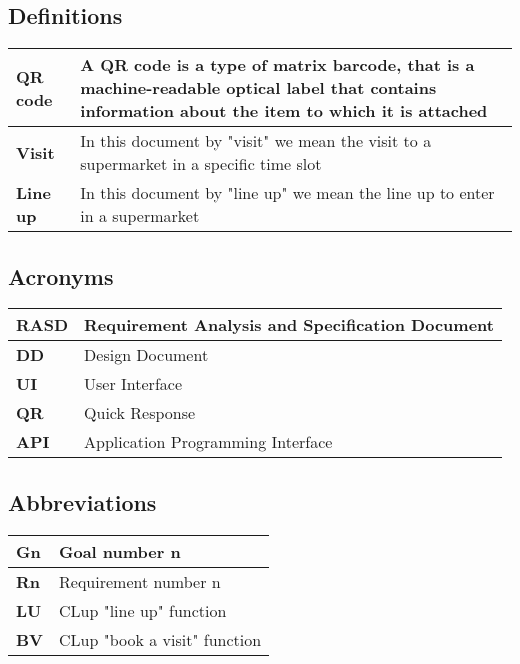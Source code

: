 \subsection{Definitions}

    \begin{center}
        {\renewcommand{\arraystretch}{2}%
        \begin{tabular}{L{2cm}L{12cm}}
            \hline
            \textbf{QR code} & A QR code is a type of matrix barcode, that is a machine-readable optical label that 
            contains information about the item to which it is attached \\
            \hline
            \textbf{Visit} & In this document by "visit" we mean the visit to a supermarket in a specific time slot \\
            \hline
            \textbf{Line up} & In this document by "line up" we mean the line up to enter in a supermarket \\
            \hline
        \end{tabular}}
    \end{center}
    

\subsection{Acronyms}

    \begin{center}
        {\renewcommand{\arraystretch}{2}%
        \begin{tabular}{L{2cm}L{12cm}}
            \hline
            \textbf{RASD} & Requirement Analysis and Specification Document \\
            \hline
            \textbf{DD} & Design Document \\
            \hline
            \textbf{UI} & User Interface \\
            \hline
            \textbf{QR} & Quick Response \\
            \hline
            \textbf{API} & Application Programming Interface \\
            \hline
        \end{tabular}}
    \end{center}

\subsection{Abbreviations}

    \begin{center}
        {\renewcommand{\arraystretch}{2}%
        \begin{tabular}{L{2cm}L{12cm}}
            \hline
            \textbf{Gn} & Goal number n \\
            \hline
            \textbf{Rn} & Requirement number n \\
            \hline
            \textbf{LU} & CLup "line up" function \\
            \hline
            \textbf{BV} & CLup "book a visit" function \\
            \hline
        \end{tabular}}
    \end{center}